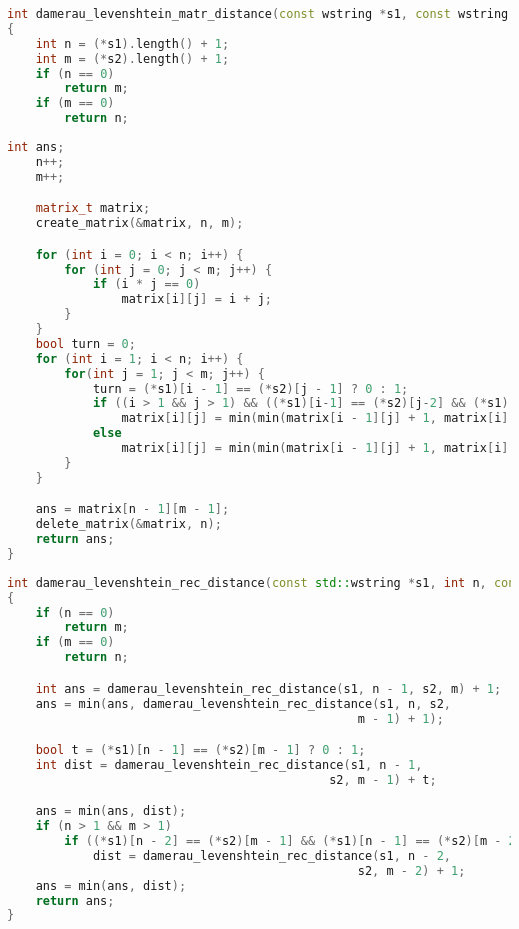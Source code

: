 \begin{lstlisting}[label=damlev,caption=Реализация нерекурсивного алгоритма поиска расстояния
Дамерау – Левенштейна (начало), language=C++]
int damerau_levenshtein_matr_distance(const wstring *s1, const wstring *s2)
{
    int n = (*s1).length() + 1;
    int m = (*s2).length() + 1;
    if (n == 0)
        return m;
    if (m == 0)
        return n;
\end{lstlisting}

\begin{lstlisting}[label=damlev1,caption=Реализация нерекурсивного алгоритма поиска расстояния
Дамерау – Левенштейна (конец), language=C++, firstnumber=last]
    int ans;
    n++;
    m++;

    matrix_t matrix;
    create_matrix(&matrix, n, m);

    for (int i = 0; i < n; i++) {
        for (int j = 0; j < m; j++) {
            if (i * j == 0)
                matrix[i][j] = i + j;
        }
    }
    bool turn = 0;
    for (int i = 1; i < n; i++) {
        for(int j = 1; j < m; j++) {
            turn = (*s1)[i - 1] == (*s2)[j - 1] ? 0 : 1;
            if ((i > 1 && j > 1) && ((*s1)[i-1] == (*s2)[j-2] && (*s1)[i-2] == (*s2)[j-1]) && (turn == 1))
                matrix[i][j] = min(min(matrix[i - 1][j] + 1, matrix[i][j - 1] + 1), min(matrix[i - 1][j - 1] + turn, matrix[i - 2][j - 2] + 1));
            else
                matrix[i][j] = min(min(matrix[i - 1][j] + 1, matrix[i][j - 1] + 1), matrix[i - 1][j - 1] + turn);
        }
    }

    ans = matrix[n - 1][m - 1];
    delete_matrix(&matrix, n);
    return ans;
}
\end{lstlisting}
\newpage
\begin{lstlisting}[label=rec_damlev,caption=Реализация рекурсивного алгоритма поиска расстояния
Дамерау – Левенштейна, language=C++]
int damerau_levenshtein_rec_distance(const std::wstring *s1, int n, const std::wstring *s2, int m)
{
    if (n == 0)
        return m;
    if (m == 0)
        return n;

    int ans = damerau_levenshtein_rec_distance(s1, n - 1, s2, m) + 1;
    ans = min(ans, damerau_levenshtein_rec_distance(s1, n, s2,
                                                 m - 1) + 1);

    bool t = (*s1)[n - 1] == (*s2)[m - 1] ? 0 : 1;
    int dist = damerau_levenshtein_rec_distance(s1, n - 1,
                                             s2, m - 1) + t;

    ans = min(ans, dist);
    if (n > 1 && m > 1)
        if ((*s1)[n - 2] == (*s2)[m - 1] && (*s1)[n - 1] == (*s2)[m - 2])
            dist = damerau_levenshtein_rec_distance(s1, n - 2,
                                                 s2, m - 2) + 1;
    ans = min(ans, dist);
    return ans;
}
\end{lstlisting}
